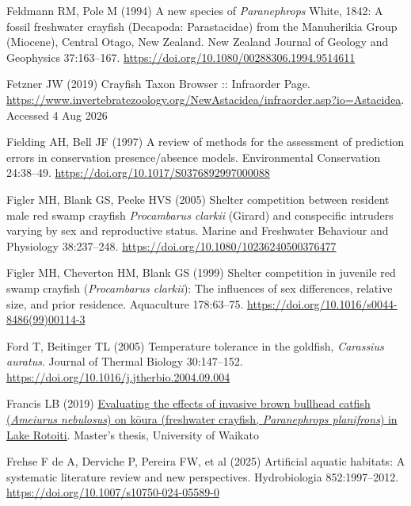 \documentclass[
  12pt,
  a4paper,
  oneside]{scrbook}
\newlength{\cslhangindent}
\newenvironment{CSLReferences}[2] %
 {\begin{list}{}{%
  \setlength{\itemindent}{0pt}
  \setlength{\leftmargin}{0pt}
  \setlength{\parsep}{0pt}
  \ifodd #1
   \setlength{\leftmargin}{\cslhangindent}
   \setlength{\itemindent}{-1\cslhangindent}
  \fi
  \setlength{\itemsep}{#2\baselineskip}}}
 {\end{list}}
\renewenvironment{CSLReferences}[2]
   {\begin{list}{}{%
    \setlength{\itemindent}{0pt}
    \setlength{\leftmargin}{0pt}
    \setlength{\parsep}{0pt}
    \ifodd #1
     \setlength{\leftmargin}{\cslhangindent}
     \setlength{\itemindent}{-1\cslhangindent}
    \fi
    \setlength{\itemsep}{0.3\baselineskip}}}
   {\end{list}}%
\begin{document}
\begin{CSLReferences}{1}{1}
Feldmann RM, Pole M (1994) A new species of {\emph{Paranephrops}}
{White}, 1842: A fossil freshwater crayfish ({Decapoda}: {Parastacidae})
from the {Manuherikia Group} ({Miocene}), {Central Otago}, {New
Zealand}. New Zealand Journal of Geology and Geophysics 37:163--167.
\url{https://doi.org/10.1080/00288306.1994.9514611}

Fetzner JW (2019) Crayfish {Taxon Browser :: Infraorder Page}.
\url{https://www.invertebratezoology.org/NewAstacidea/infraorder.asp?io=Astacidea}.
Accessed 4 Aug 2026

Fielding AH, Bell JF (1997) A review of methods for the assessment of
prediction errors in conservation presence/absence models. Environmental
Conservation 24:38--49. \url{https://doi.org/10.1017/S0376892997000088}

Figler MH, Blank GS, Peeke HVS (2005) Shelter competition between
resident male red swamp crayfish {\emph{Procambarus clarkii}} ({Girard})
and conspecific intruders varying by sex and reproductive status. Marine
and Freshwater Behaviour and Physiology 38:237--248.
\url{https://doi.org/10.1080/10236240500376477}

Figler MH, Cheverton HM, Blank GS (1999) Shelter competition in juvenile
red swamp crayfish ({\emph{Procambarus clarkii}}): The influences of sex
differences, relative size, and prior residence. Aquaculture 178:63--75.
\url{https://doi.org/10.1016/s0044-8486(99)00114-3}

Ford T, Beitinger TL (2005) Temperature tolerance in the goldfish,
{\emph{Carassius auratus}}. Journal of Thermal Biology 30:147--152.
\url{https://doi.org/10.1016/j.jtherbio.2004.09.004}

Francis LB (2019)
\href{https://researchcommons.waikato.ac.nz/handle/10289/12746}{Evaluating
the effects of invasive brown bullhead catfish ({\emph{Ameiurus
nebulosus}}) on k{ō}ura (freshwater crayfish, {\emph{Paranephrops
planifrons}}) in {Lake Rotoiti}}. Master's thesis, University of Waikato

Frehse F de A, Derviche P, Pereira FW, et al (2025) Artificial aquatic
habitats: A systematic literature review and new perspectives.
Hydrobiologia 852:1997--2012.
\url{https://doi.org/10.1007/s10750-024-05589-0}


\end{CSLReferences}
\end{document}
